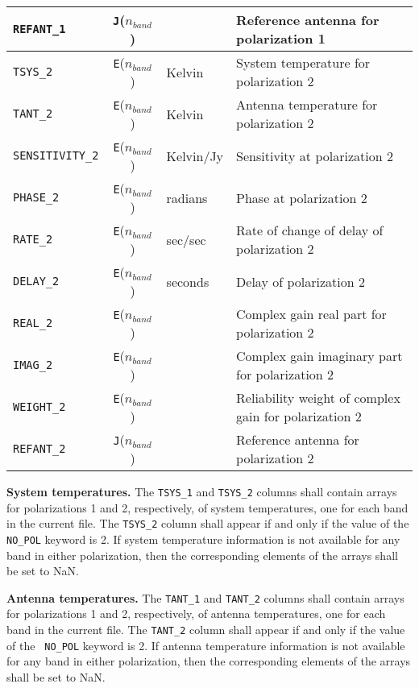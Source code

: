 \documentclass[twoside]{article}
\newcommand{\nband}{$n_{band}$}
\begin{document}
\begin{center}
\begin{tabular}{lcll}
{\tt REFANT\_1}   & {\tt J}(\nband) &         & Reference antenna for
                                      polarization 1 \\
\hline
{\tt TSYS\_2}     & {\tt E}(\nband) & Kelvin & System temperature for
                                      polarization 2 \\
{\tt TANT\_2}     & {\tt E}(\nband) & Kelvin & Antenna temperature for
                                      polarization 2 \\
{\tt SENSITIVITY\_2} & {\tt E}(\nband) & Kelvin/Jy & Sensitivity at
                                      polarization 2 \\
{\tt PHASE\_2}    & {\tt E}(\nband) & radians & Phase at
                                      polarization 2 \\
{\tt RATE\_2}     & {\tt E}(\nband) & sec/sec & Rate of change of
                                      delay of polarization 2 \\
{\tt DELAY\_2}    & {\tt E}(\nband) & seconds & Delay of
                                      polarization 2 \\
{\tt REAL\_2}     & {\tt E}(\nband) &         & Complex gain real part
                                      for polarization 2 \\
{\tt IMAG\_2}     & {\tt E}(\nband) &         & Complex gain imaginary
                                      part for polarization 2 \\
{\tt WEIGHT\_2}   & {\tt E}(\nband) &         & Reliability weight of
                                      complex gain for polarization 2 \\
{\tt REFANT\_2}   & {\tt J}(\nband) &         & Reference antenna for
                                      polarization 2 \\
\end{tabular}
\end{center}

{\bf System temperatures.}  The {\tt TSYS\_1} and {\tt TSYS\_2}
columns shall contain arrays for polarizations 1 and 2, respectively,
of system temperatures, one for each band in the current file.  The
{\tt TSYS\_2} column shall appear if and only if the value of the {\tt
NO\_POL} keyword is 2.  If system temperature information is not
available for any band in either polarization, then the corresponding
elements of the arrays shall be set to NaN\@.

{\bf Antenna temperatures.}  The {\tt TANT\_1} and {\tt TANT\_2}
columns shall contain arrays for polarizations 1 and 2, respectively,
of antenna temperatures, one for each band in the current file.  The
{\tt TANT\_2} column shall appear if and only if the value of the {\tt
NO\_POL} keyword is 2.  If antenna temperature information is not
available for any band in either polarization, then the corresponding
elements of the arrays shall be set to NaN\@.
\end{document}
